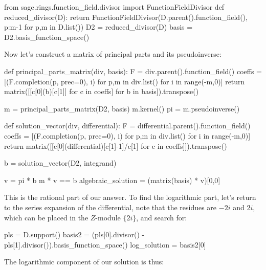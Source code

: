 \begin{sageblock}[ex8.7]
from sage.rings.function_field.divisor import FunctionFieldDivisor
def reduced_divisor(D):
    return FunctionFieldDivisor(D.parent().function_field(),
                                {p:m-1 for p,m in D.list()})
D2 = reduced_divisor(D)
basis = D2.basis_function_space()
\end{sageblock}

Now let's construct a matrix of principal parts
and its pseudoinverse:

\begin{sageblock}[ex8.7]
def principal_parts_matrix(div, basis):
    F = div.parent().function_field()
    coeffs = [(F.completion(p, prec=0), i) for p,m in div.list() for i in range(-m,0)]
    return matrix([[c[0](b)[c[1]] for c in coeffs] for b in basis]).transpose()
\end{sageblock}

\begin{sageblock}[ex8.7]
m = principal_parts_matrix(D2, basis)
m.kernel()
pi = m.pseudoinverse()
\end{sageblock}

\begin{sageblock}[ex8.7]
def solution_vector(div, differential):
    F = differential.parent().function_field()
    coeffs = [(F.completion(p, prec=0), i) for p,m in div.list() for i in range(-m,0)]
    return matrix([[c[0](differential)[c[1]-1]/c[1] for c in coeffs]]).transpose()
\end{sageblock}

\begin{sageblock}[ex8.7]
b = solution_vector(D2, integrand)
\end{sageblock}

\begin{sageblock}[ex8.7]
v = pi * b
m * v == b
algebraic_solution = (matrix(basis) * v)[0,0]
\end{sageblock}

This is the rational part of our answer.  To find the logarithmic
part, let's return to the series expansion of the differential,
note that the residues are $-2i$ and $2i$, which can be placed
in the $Z$-module $\{2i\}$, and search for:

\begin{sageblock}[ex8.7]
pls = D.support()
basis2 = (pls[0].divisor() - pls[1].divisor()).basis_function_space()
log_solution = basis2[0]
\end{sageblock}

The logarithmic component of our solution is thus:

